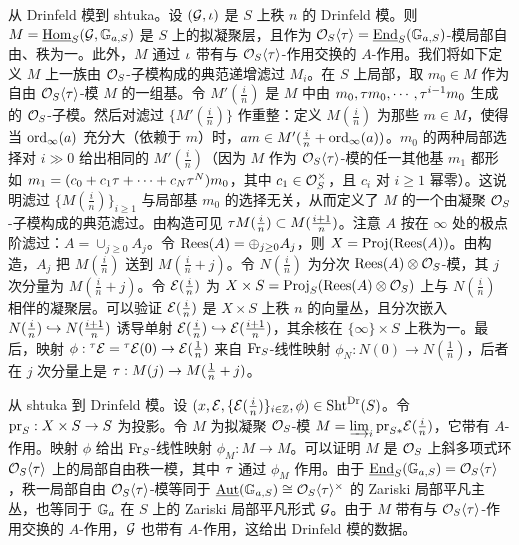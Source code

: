 从 Drinfeld 模到 shtuka。设 $(\mathcal{G},\iota)$ 是 $S$ 上秩 $n$ 的 Drinfeld 模。则 $M=\underline{\textup{Hom}}_{S}(\mathcal{G},\mathbb{G}_{a,S})$ 是 $S$ 上的拟凝聚层，且作为 $\mathcal{O}_{S}\langle{\tau}\rangle=\underline{\textup{End}}_{S}(\mathbb{G}_{a,S})$-模局部自由、秩为一。此外，$M$ 通过 $\iota$ 带有与 $\mathcal{O}_{S}\langle{\tau}\rangle$-作用交换的 $A$-作用。我们将如下定义 $M$ 上一族由 $\mathcal{O}_{S}$-子模构成的典范递增滤过 $M_{i}$。在 $S$ 上局部，取 $m_{0}\in M$ 作为自由 $\mathcal{O}_{S}\langle{\tau}\rangle$-模 $M$ 的一组基。令 $M'(\frac{i}{n})$ 是 $M$ 中由 $m_{0}, \tau m_{0},\cdots, \tau^{i-1}m_{0}$ 生成的 $\mathcal{O}_{S}$-子模。然后对滤过 $\{M'(\frac{i}{n})\}$ 作重整：定义 $M(\frac{i}{n})$ 为那些 $m\in M$，使得当 $\mathrm{ord}_{\infty}(a)$ 充分大（依赖于 $m$）时，$am\in M'(\frac{i}{n}+\mathrm{ord}_{\infty}(a))$。$m_{0}$ 的两种局部选择对 $i\gg0$ 给出相同的 $M'(\frac{i}{n})$（因为 $M$ 作为 $\mathcal{O}_{S}\langle{\tau}\rangle$-模的任一其他基 $m_{1}$ 都形如 $m_{1}=(c_{0}+c_{1}\tau+\cdots +c_{N}\tau^{N})m_{0}$，其中 $c_{1}\in \mathcal{O}_{S}^{\times}$，且 $c_{i}$ 对 $i\ge1$ 幂零）。这说明滤过 $\{M(\frac{i}{n})\}_{i\ge1}$ 与局部基 $m_{0}$ 的选择无关，从而定义了 $M$ 的一个由凝聚 $\mathcal{O}_{S}$-子模构成的典范滤过。由构造可见 $\tau M(\frac{i}{n})\subset M(\frac{i+1}{n})$。注意 $A$ 按在 $\infty$ 处的极点阶滤过：$A=\cup_{j\ge0}A_{j}$。令 $\mathrm{Rees}(A)=\oplus_{j\ge0}A_{j}$，则 $X=\textup{Proj} (\mathrm{Rees}(A))$。由构造，$A_{j}$ 把 $M(\frac{i}{n})$ 送到 $M(\frac{i}{n}+j)$。令 $N(\frac{i}{n})$ 为分次 $\mathrm{Rees}(A)\otimes\mathcal{O}_{S}$-模，其 $j$ 次分量为 $M(\frac{i}{n}+j)$。令 $\mathcal{E}(\frac{i}{n})$ 为 $X\times S=\textup{Proj}_{S}(\mathrm{Rees}(A)\otimes\mathcal{O}_{S})$ 上与 $N(\frac{i}{n})$ 相伴的凝聚层。可以验证 $\mathcal{E}(\frac{i}{n})$ 是 $X\times S$ 上秩 $n$ 的向量丛，且分次嵌入 $N(\frac{i}{n})\hookrightarrow N(\frac{i+1}{n})$ 诱导单射 $\mathcal{E}(\frac{i}{n})\hookrightarrow \mathcal{E}(\frac{i+1}{n})$，其余核在 $\{\infty\}\times S$ 上秩为一。最后，映射 $\phi: {}^{\tau}\mathcal{E}={}^{\tau}\mathcal{E}(0)\to \mathcal{E}(\frac{1}{n})$ 来自 $\textup{Fr}_{S}$-线性映射 $\phi_{N}: N(0)\to N(\frac{1}{n})$，后者在 $j$ 次分量上是 $\tau: M(j)\to M(\frac{1}{n}+j)$。

从 shtuka 到 Drinfeld 模。设 $(x, \mathcal{E}, \{\mathcal{E}(\frac{i}{n})\}_{i\in \mathbb{Z}}, \phi)\in \textup{Sht}^{\mathrm{Dr}}(S)$。令 $\textup{pr}_{S}: X\times S\to S$ 为投影。令 $M$ 为拟凝聚 $\mathcal{O}_{S}$-模 $M=\varinjlim_{i}\textup{pr}_{S*}\mathcal{E}(\frac{i}{n})$，它带有 $A$-作用。映射 $\phi$ 给出 $\textup{Fr}_{S}$-线性映射 $\phi_{M}: M\to M$。可以证明 $M$ 是 $\mathcal{O}_{S}$ 上斜多项式环 $\mathcal{O}_{S}\langle{\tau}\rangle$ 上的局部自由秩一模，其中 $\tau$ 通过 $\phi_{M}$ 作用。由于 $\underline{\textup{End}}_{S}(\mathbb{G}_{a,S})=\mathcal{O}_{S}\langle{\tau}\rangle$，秩一局部自由 $\mathcal{O}_{S}\langle{\tau}\rangle$-模等同于 $\underline{\textup{Aut}}(\mathbb{G}_{a,S})\cong \mathcal{O}_{S}\langle{\tau}\rangle^{\times}$ 的 Zariski 局部平凡主丛，也等同于 $\mathbb{G}_{a}$ 在 $S$ 上的 Zariski 局部平凡形式 $\mathcal{G}$。由于 $M$ 带有与 $\mathcal{O}_{S}\langle{\tau}\rangle$-作用交换的 $A$-作用，$\mathcal{G}$ 也带有 $A$-作用，这给出 Drinfeld 模的数据。

